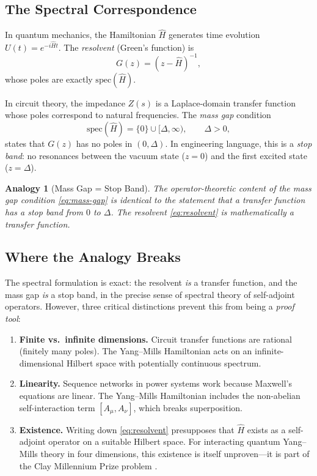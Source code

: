 \documentclass[11pt]{article}
\newtheorem{analogy}[theorem]{Analogy}
\newcommand{\spec}{\mathrm{spec}}
\begin{document}
\subsection{The Spectral Correspondence}

In quantum mechanics, the Hamiltonian $\hat{H}$ generates time evolution
$U(t) = e^{-i\hat{H}t}$. The \emph{resolvent} (Green's function) is
\begin{equation}\label{eq:resolvent}
  G(z) = (z - \hat{H})^{-1},
\end{equation}
whose poles are exactly $\spec(\hat{H})$.

In circuit theory, the impedance $Z(s)$ is a Laplace-domain transfer
function whose poles correspond to natural frequencies. The
\emph{mass gap} condition
\begin{equation}\label{eq:mass-gap}
  \spec(\hat{H}) = \{0\} \cup [\Delta, \infty), \qquad \Delta > 0,
\end{equation}
states that $G(z)$ has no poles in $(0, \Delta)$. In engineering
language, this is a \emph{stop band}: no resonances between the vacuum
state ($z = 0$) and the first excited state ($z = \Delta$).

\begin{analogy}[Mass Gap = Stop Band]\label{an:stopband}
The operator-theoretic content of the mass gap condition
\eqref{eq:mass-gap} is identical to the statement that a transfer
function has a stop band from $0$ to $\Delta$. The resolvent
\eqref{eq:resolvent} is mathematically a transfer function.
\end{analogy}

\subsection{Where the Analogy Breaks}

The spectral formulation is exact: the resolvent \emph{is} a transfer
function, and the mass gap \emph{is} a stop band, in the precise sense
of spectral theory of self-adjoint operators. However, three critical
distinctions prevent this from being a \emph{proof tool}:

\begin{enumerate}[leftmargin=*]
\item \textbf{Finite vs.\ infinite dimensions.} Circuit transfer
  functions are rational (finitely many poles). The Yang--Mills
  Hamiltonian acts on an infinite-dimensional Hilbert space with
  potentially continuous spectrum.

\item \textbf{Linearity.} Sequence networks in power systems work
  because Maxwell's equations are linear. The Yang--Mills Hamiltonian
  includes the non-abelian self-interaction term $[A_\mu, A_\nu]$,
  which breaks superposition.

\item \textbf{Existence.} Writing down \eqref{eq:resolvent} presupposes
  that $\hat{H}$ exists as a self-adjoint operator on a suitable Hilbert
  space. For interacting quantum Yang--Mills theory in four dimensions,
  this existence is itself unproven---it is part of the Clay Millennium
  Prize problem \cite{jaffe-witten2000}.
\end{enumerate}
\end{document}

